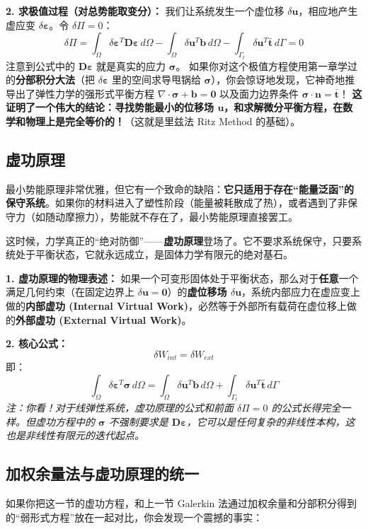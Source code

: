 \documentclass[11pt, a4paper, UTF8]{ctexart}
\begin{document}
\textbf{2. 求极值过程（对总势能取变分）：}
我们让系统发生一个虚位移 $\delta \bm{u}$，相应地产生虚应变 $\delta \bm{\varepsilon}$。令 $\delta \Pi = 0$：
\[ \delta \Pi = \int_{\Omega} \delta \bm{\varepsilon}^T \bm{D} \bm{\varepsilon} \, d\Omega - \int_{\Omega} \delta \bm{u}^T \bm{b} \, d\Omega - \int_{\Gamma_t} \delta \bm{u}^T \bar{\bm{t}} \, d\Gamma = 0 \]
注意到公式中的 $\bm{D} \bm{\varepsilon}$ 就是真实的应力 $\bm{\sigma}$。
如果你对这个极值方程使用第一章学过的\textbf{分部积分大法}（把 $\delta \bm{\varepsilon}$ 里的空间求导甩锅给 $\bm{\sigma}$），你会惊讶地发现，它神奇地推导出了弹性力学的强形式平衡方程 $\nabla \cdot \bm{\sigma} + \bm{b} = \bm{0}$ 以及面力边界条件 $\bm{\sigma} \cdot \bm{n} = \bar{\bm{t}}$！
\textbf{这证明了一个伟大的结论：寻找势能最小的位移场 $\bm{u}$，和求解微分平衡方程，在数学和物理上是完全等价的！}（这就是里兹法 Ritz Method 的基础）。

\subsection{虚功原理}
最小势能原理非常优雅，但它有一个致命的缺陷：\textbf{它只适用于存在“能量泛函”的保守系统}。如果你的材料进入了塑性阶段（能量被耗散成了热），或者遇到了非保守力（如随动摩擦力），势能就不存在了，最小势能原理直接罢工。

这时候，力学真正的“绝对防御”——\textbf{虚功原理}登场了。它不要求系统保守，只要系统处于平衡状态，它就永远成立，是固体力学有限元的绝对基石。

\textbf{1. 虚功原理的物理表述：}
如果一个可变形固体处于平衡状态，那么对于\textbf{任意}一个满足几何约束（在固定边界上 $\delta \bm{u} = \bm{0}$）的\textbf{虚位移场 $\delta \bm{u}$}，系统内部应力在虚应变上做的\textbf{内部虚功 (Internal Virtual Work)}，必然等于外部所有载荷在虚位移上做的\textbf{外部虚功 (External Virtual Work)}。

\textbf{2. 核心公式：}
\[ \delta W_{int} = \delta W_{ext} \]
即：
\[ \int_{\Omega} \delta \bm{\varepsilon}^T \bm{\sigma} \, d\Omega = \int_{\Omega} \delta \bm{u}^T \bm{b} \, d\Omega + \int_{\Gamma_t} \delta \bm{u}^T \bar{\bm{t}} \, d\Gamma \]
\textit{注：你看！对于线弹性系统，虚功原理的公式和前面 $\delta \Pi = 0$ 的公式长得完全一样。但虚功方程中的 $\bm{\sigma}$ 不强制要求是 $\bm{D}\bm{\varepsilon}$，它可以是任何复杂的非线性本构，这也是非线性有限元的迭代起点。}

\subsection{加权余量法与虚功原理的统一}
如果你把这一节的虚功方程，和上一节 Galerkin 法通过加权余量和分部积分得到的“弱形式方程”放在一起对比，你会发现一个震撼的事实：
\end{document}
